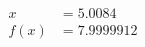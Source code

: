 \documentclass[preview]{standalone}
\begin{document}
\begin{align*}
x &= 5.0084\\f(x) &= 7.9999912
\end{align*}
\end{document}

